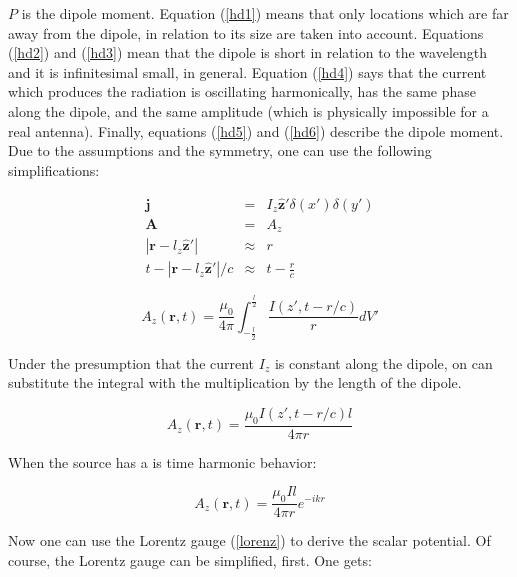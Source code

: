 \documentclass[a4paper,11pt]{report}
\begin{document}
$P$ is the dipole moment. Equation (\ref{hd1}) means that only locations which are far away from the dipole, in relation to its size are taken into account. Equations (\ref{hd2}) and (\ref{hd3}) mean that the dipole is short in relation to the wavelength and it is infinitesimal small, in general. Equation (\ref{hd4}) says that the current which produces the radiation is oscillating harmonically, has the same phase along the dipole, and the same amplitude (which is physically impossible for a real antenna). Finally, equations (\ref{hd5}) and (\ref{hd6}) describe the dipole moment.\\


Due to the assumptions and the symmetry, one can use the following simplifications:

\begin{eqnarray}
  \mathbf{j} &=& I_z\mathbf{ \hat{z}'} \delta (x') \delta (y') \label{hd_simpli_1}\\
\mathbf{A} &=& A_z \label{hd_simpli_2} \\
|\mathbf{r}-l_z\mathbf{ \hat{z}'}| &\approx& r \label{hd_simpli_3}\\
t-|\mathbf{r}-l_z\mathbf{ \hat{z}'}| / c &\approx& t-\frac{r}{c}\label{hd_simpli_4}
\end{eqnarray}

\begin{equation}\label{simple_potential_solution}
 A_z (\mathbf{r},t) = \frac{ \mu_0}{4 \pi}\int^{\frac{l}{2}}_{-\frac{l}{2}} \frac{ I ( z', t- r/c  )}{r}  dV'
\end{equation}

Under the presumption that the current $I_z$ is constant along the dipole, on can substitute the integral with the multiplication by the length of the dipole.

\begin{equation}\label{simple_potential_solution2}
 A_z (\mathbf{r},t) = \frac{ \mu_0 I ( z', t- r/c  ) l}{4 \pi r}
\end{equation}

When the source has a is time harmonic behavior:

\begin{equation}\label{simple_potential_solution_timeharmonic}
 A_z (\mathbf{r},t) = \frac{\mu_0 I l}{4 \pi r} e^{-ikr }
\end{equation}


Now one can use the Lorentz gauge (\ref{lorenz}) to derive the scalar potential. Of course, the Lorentz gauge can be simplified, first. One gets:
\end{document}
